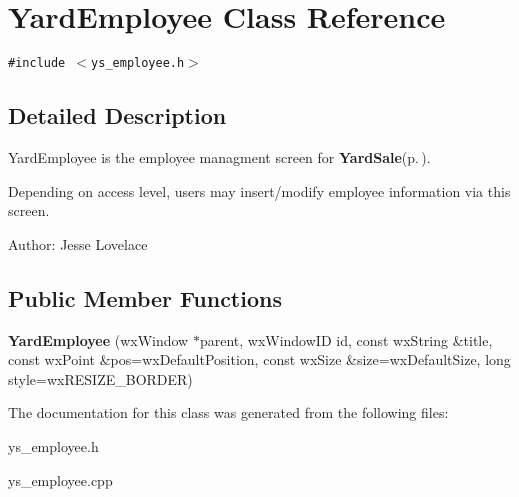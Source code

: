 \section{Yard\-Employee Class Reference}
\label{classYardEmployee}
{\tt \#include $<$ys\_\-employee.h$>$}



\subsection{Detailed Description}
Yard\-Employee is the employee managment screen for {\bf Yard\-Sale}{\rm (p.\,\pageref{classYardSale})}. 

Depending on access level, users may insert/modify employee information via this screen. \begin{Desc}
\item[Author:]Jesse Lovelace \end{Desc}


\subsection*{Public Member Functions}
\begin{CompactItemize}
\item 
{\bf Yard\-Employee} (wx\-Window $\ast$parent, wx\-Window\-ID id, const wx\-String \&title, const wx\-Point \&pos=wx\-Default\-Position, const wx\-Size \&size=wx\-Default\-Size, long style=wx\-RESIZE\_\-BORDER)\label{classYardEmployee_a0}

\end{CompactItemize}


The documentation for this class was generated from the following files:\begin{CompactItemize}
\item 
ys\_\-employee.h\item 
ys\_\-employee.cpp\end{CompactItemize}
